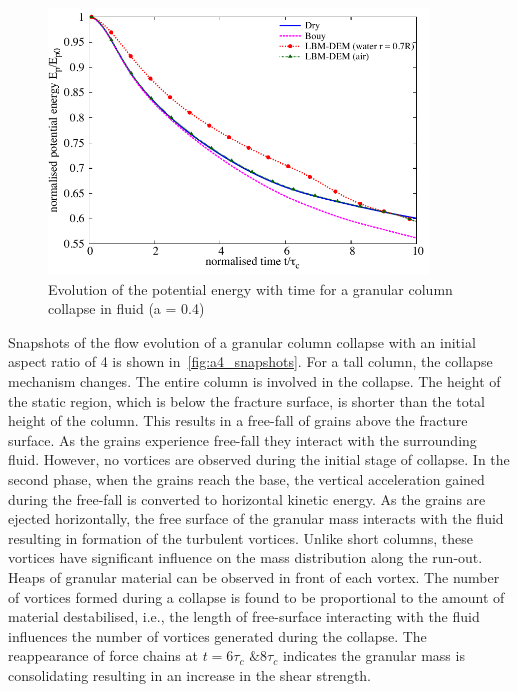 \begin{figure}
	\centering
    \includegraphics[width=0.9\textwidth]{PE_a04f}
    \caption{Evolution of the potential energy with time for a granular column 
    collapse in fluid (a = 0.4)}
    \label{fig:PE_a04f}
\end{figure}


Snapshots of the flow evolution of a granular column collapse with an initial 
aspect ratio of 4 is shown in~\cref{fig:a4_snapshots}. For a tall column, the 
collapse mechanism changes. The entire column is involved in the collapse. The 
height of the static region, which is below the fracture surface, is shorter 
than the total height of the column. This results in a free-fall of grains 
above the fracture surface. As the grains experience free-fall they interact 
with the surrounding fluid. However, no vortices are observed during the 
initial stage of collapse. In the second phase, when the grains reach the base, 
the vertical acceleration gained during the free-fall is converted to 
horizontal kinetic energy. As the grains are ejected horizontally, the free 
surface of the granular mass interacts with the fluid resulting in formation of 
the turbulent vortices. Unlike short columns, these vortices have significant 
influence on the mass distribution along the run-out. Heaps of granular 
material can be observed in front of each vortex. The number of vortices 
formed during a collapse is found to be proportional to the amount of material 
destabilised, i.e., the length of free-surface interacting with the fluid 
influences the number of vortices generated during the collapse. The 
reappearance of force chains at $t = 6\tau_c$ $\& 8\tau_c$ indicates the 
granular mass is consolidating resulting in an increase in the shear strength. 

